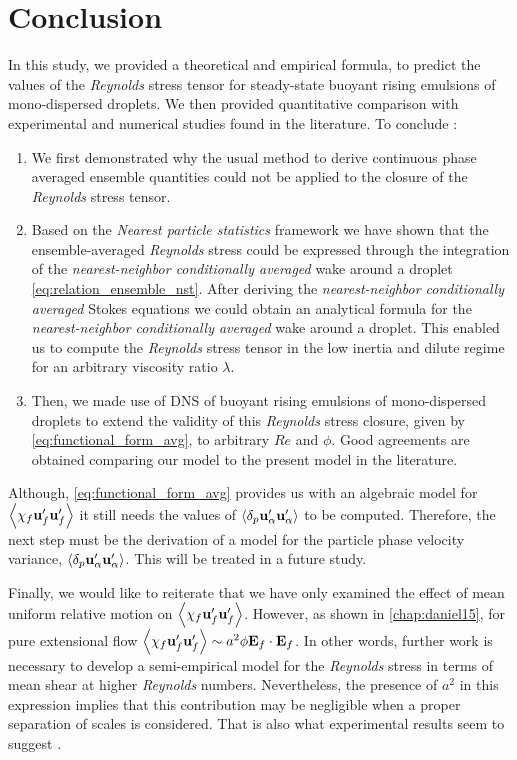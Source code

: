 \section{Conclusion}

In this study, we provided a theoretical and empirical formula, to predict the values of the \textit{Reynolds} stress tensor for steady-state buoyant rising emulsions of mono-dispersed droplets. 
We then provided quantitative comparison with experimental and numerical studies found in the literature. 
To conclude : 
\begin{enumerate}
    \item We first demonstrated why the usual method to derive continuous phase averaged ensemble quantities could not be applied to the closure of the \textit{Reynolds} stress tensor. 
    \item Based on the \textit{Nearest particle statistics} framework we have shown that the ensemble-averaged \textit{Reynolds} stress could be expressed through the integration of the \textit{nearest-neighbor conditionally averaged} wake around a droplet \eqref{eq:relation_ensemble_nst}. 
    After deriving the \textit{nearest-neighbor conditionally averaged} Stokes equations we could obtain an analytical formula for the \textit{nearest-neighbor conditionally averaged} wake around a droplet.
    This enabled us to compute the \textit{Reynolds} stress tensor in the low inertia and dilute regime for an arbitrary viscosity ratio $\lambda$. 
    \item  Then, we made use of DNS of buoyant rising emulsions of mono-dispersed droplets to extend the validity of this \textit{Reynolds} stress closure, given by \ref{eq:functional_form_avg}, to arbitrary $Re$ and $\phi$. 
    Good agreements are obtained comparing our model to the present model in the literature.  
\end{enumerate}
Although, \ref{eq:functional_form_avg} provides us with an algebraic model for $\left<\chi_f \textbf{u}_f'\textbf{u}_f'\right>$ it still needs the values of $\left<\delta_p \textbf{u}_\alpha' \textbf{u}_\alpha'\right>$ to be computed. 
Therefore, the next step must be the derivation of a model for the particle phase velocity variance, $\left<\delta_p \textbf{u}_\alpha' \textbf{u}_\alpha'\right>$. 
This will be treated in a future study. 

Finally, we would like to reiterate that we have only examined the effect of mean uniform relative motion on $\left<\chi_f \textbf{u}_f'\textbf{u}_f'\right>$. However, as shown in \ref{chap:daniel15}, for pure extensional flow $\left<\chi_f \textbf{u}_f'\textbf{u}_f'\right> \sim a^2\phi \textbf{E}_f \cdot \textbf{E}_f$.
In other words, further work is necessary to develop a semi-empirical model for the \textit{Reynolds} stress in terms of mean shear at higher \textit{Reynolds} numbers.
Nevertheless, the presence of $a^2$ in this expression implies that this contribution may be negligible when a proper separation of scales is considered.
That is also what experimental results seem to suggest \citet{guazzelli2011}. 